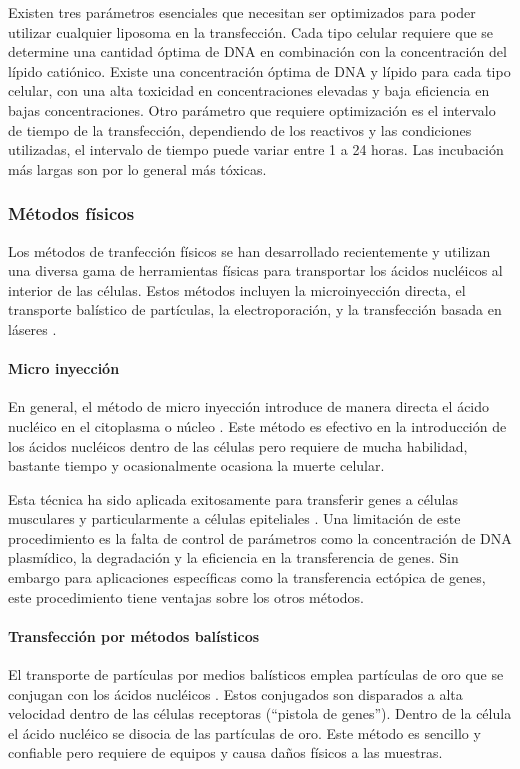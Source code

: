 \documentclass[fleqn,10pt]{SelfArx} %
\begin{document}
Existen tres parámetros esenciales que necesitan ser optimizados para poder utilizar cualquier liposoma en la transfección. Cada tipo celular requiere que se determine una cantidad óptima de DNA en combinación con la concentración del lípido catiónico. Existe una concentración óptima de DNA y lípido para cada tipo celular, con una alta toxicidad en concentraciones elevadas y baja eficiencia en bajas concentraciones. Otro parámetro que requiere optimización es el intervalo de tiempo de la transfección, dependiendo de los reactivos y las condiciones utilizadas, el intervalo de tiempo puede variar entre 1 a 24 horas. Las incubación más largas son por lo general más tóxicas.

\subsubsection{Métodos físicos}
Los métodos de tranfección físicos se han desarrollado recientemente y utilizan una diversa gama de herramientas físicas para transportar los ácidos nucléicos al interior de las células. Estos métodos incluyen la microinyección directa, el transporte balístico de partículas, la electroporación, y la transfección basada en láseres \cite{Mehier-Humbert:2005aa}.  

\paragraph*{Micro inyección}
En general, el método de micro inyección introduce de manera directa el ácido nucléico en el citoplasma o núcleo \cite{Martinou:1995aa, Ikeda:1995aa}. Este método es efectivo en la introducción de los ácidos nucléicos dentro de las células pero requiere de mucha habilidad, bastante tiempo y ocasionalmente ocasiona la muerte celular. 

Esta técnica ha sido aplicada exitosamente para transferir genes a células musculares y particularmente a células epiteliales \cite{Sawamura:2002aa, Davis:1993aa}. Una limitación de este procedimiento es la falta de control de parámetros como la concentración de DNA plasmídico, la degradación y la eficiencia en la transferencia de genes. Sin embargo para aplicaciones específicas como la transferencia ectópica de genes, este procedimiento tiene ventajas sobre los otros métodos.

\paragraph*{Transfección por métodos balísticos}
El transporte de partículas por medios balísticos emplea partículas de oro que se conjugan con los ácidos nucléicos \cite{Lo:1994aa, OBrien:2006aa}. Estos conjugados son disparados a alta velocidad dentro de las células receptoras (``pistola de genes''). Dentro de la célula el ácido nucléico se disocia de las partículas de oro.  Este método es sencillo y confiable pero requiere de equipos y causa daños físicos a las muestras. 
\end{document}
